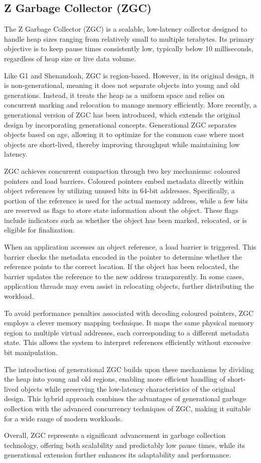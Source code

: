 \subsection{Z Garbage Collector (ZGC)}

The Z Garbage Collector (ZGC) is a scalable, low-latency collector designed to handle heap sizes ranging from relatively small to multiple terabytes. Its primary objective is to keep pause times consistently low, typically below 10 milliseconds, regardless of heap size or live data volume.

Like G1 and Shenandoah, ZGC is region-based. However, in its original design, it is non-generational, meaning it does not separate objects into young and old generations. Instead, it treats the heap as a uniform space and relies on concurrent marking and relocation to manage memory efficiently. More recently, a generational version of ZGC has been introduced, which extends the original design by incorporating generational concepts. Generational ZGC separates objects based on age, allowing it to optimize for the common case where most objects are short-lived, thereby improving throughput while maintaining low latency.

ZGC achieves concurrent compaction through two key mechanisms: coloured pointers and load barriers. Coloured pointers embed metadata directly within object references by utilizing unused bits in 64-bit addresses. Specifically, a portion of the reference is used for the actual memory address, while a few bits are reserved as flags to store state information about the object. These flags include indicators such as whether the object has been marked, relocated, or is eligible for finalization.

When an application accesses an object reference, a load barrier is triggered. This barrier checks the metadata encoded in the pointer to determine whether the reference points to the correct location. If the object has been relocated, the barrier updates the reference to the new address transparently. In some cases, application threads may even assist in relocating objects, further distributing the workload.

To avoid performance penalties associated with decoding coloured pointers, ZGC employs a clever memory mapping technique. It maps the same physical memory region to multiple virtual addresses, each corresponding to a different metadata state. This allows the system to interpret references efficiently without excessive bit manipulation.

The introduction of generational ZGC builds upon these mechanisms by dividing the heap into young and old regions, enabling more efficient handling of short-lived objects while preserving the low-latency characteristics of the original design. This hybrid approach combines the advantages of generational garbage collection with the advanced concurrency techniques of ZGC, making it suitable for a wide range of modern workloads.

Overall, ZGC represents a significant advancement in garbage collection technology, offering both scalability and predictably low pause times, while its generational extension further enhances its adaptability and performance.